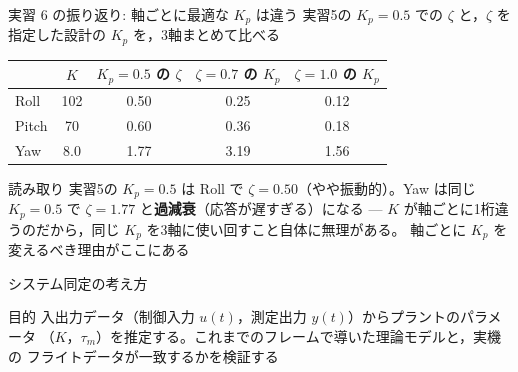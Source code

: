 \begin{frame}{実習 6 の振り返り: 軸ごとに最適な $K_p$ は違う\later}
  {\footnotesize 実習5の $K_p=0.5$ での $\zeta$ と，$\zeta$ を指定した設計の $K_p$ を，3軸まとめて比べる}

  \vspace{0.3em}

  \begin{table}
    \centering\footnotesize
    \begin{tabular}{lcccc}
      \hline
      & \textbf{$K$} & \textbf{$K_p=0.5$ の $\zeta$}
      & \textbf{$\zeta=0.7$ の $K_p$} & \textbf{$\zeta=1.0$ の $K_p$} \\
      \hline
      Roll  & 102 & 0.50 & 0.25 & 0.12 \\
      Pitch &  70 & 0.60 & 0.36 & 0.18 \\
      Yaw   & 8.0 & 1.77 & 3.19 & 1.56 \\
      \hline
    \end{tabular}
  \end{table}

  \vspace{0.5em}

  \begin{exampleblock}{読み取り}\footnotesize
    実習5の $K_p=0.5$ は Roll で $\zeta=0.50$（やや振動的）。Yaw は同じ
    $K_p=0.5$ で $\zeta=1.77$ と\textbf{過減衰}（応答が遅すぎる）になる ---
    $K$ が軸ごとに1桁違うのだから，同じ $K_p$ を3軸に使い回すこと自体に無理がある。
    軸ごとに $K_p$ を変えるべき理由がここにある
  \end{exampleblock}
\end{frame}


\begin{frame}{システム同定の考え方}
  \begin{center}
  \end{center}

  \begin{block}{目的}\footnotesize
    入出力データ（制御入力 $u(t)$，測定出力 $y(t)$）からプラントのパラメータ
    （$K$，$\tau_m$）を推定する。これまでのフレームで導いた理論モデルと，実機の
    フライトデータが一致するかを検証する
  \end{block}
\end{frame}

